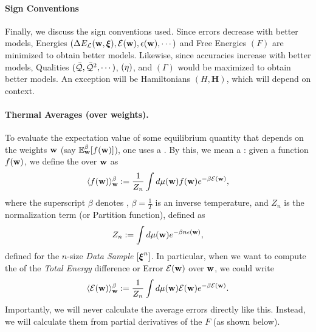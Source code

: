 \paragraph{Sign Conventions}
Finally, we discuss the sign conventions used.  Since errors decrease with better models,
Energies $(\Delta E_{\mathcal{L}}(\mathbf{w},\boldsymbol{\xi}), \mathcal{E}(\mathbf{w}), \epsilon({\mathbf{w}}), \cdots)$ and Free Energies $(F)$ are minimized to obtain better models.
Likewise, since accuracies increase with better models, Qualities $(\bar{\mathcal{Q}}, \bar{\mathcal{Q}}^{2}, \cdots)$,
\SelfOverlap $(\eta)$, and \Quality \GeneratingFunction $(\Gamma)$ would be maximized to obtain better models.
An exception will be Hamiltonians $(H,\mathbf{H})$, which will depend on context.

\paragraph{Thermal Averages (over weights).}

To evaluate the expectation value of some equilibrium quantity that depends on the weights ${\mathbf{w}}$ (say $\mathbb{E}^{\beta}_{{\mathbf{w}}}[f({\mathbf{w}})]$), one uses a \ThermalAverage.
By this, we mean a \emph{\BoltzmannWeightedAverage}: given a function $f({\mathbf{w}})$,
we define the \ThermalAverage over ${\mathbf{w}}$ as
\begin{align}
\label{eqn:thrmavg}
\langle f({\mathbf{w}})\rangle_{{\mathbf{w}}}^{{\beta}}:=\dfrac{1}{Z_{n}}\int d\mu({\mathbf{w}}) f({\mathbf{w}})e^{-\beta \mathcal{E}(\mathbf{w})}  ,
\end{align}
where the superscript $\beta$ denotes \ThermalAverage,
$\beta=\frac{1}{T}$ is an inverse temperature, and 
$Z_{n}$ is the normalization term (or Partition function), defined as
\begin{align}
\label{eqn:Zwn}
Z_{n}:=\int d\mu({\mathbf{w}}) e^{-\beta n\epsilon({\mathbf{w}})},
\end{align}
defined for the $n$-size \emph{Data Sample} $[\boldsymbol{\xi}^{n}]$.
%
In particular, when we want to compute the \ThermalAverage of the \emph{Total Energy} difference or Error
$\mathcal{E}(\mathbf{w})$ over ${\mathbf{w}}$, we could write
\begin{align}
\label{eqn:Detot}
\langle \mathcal{E}(\mathbf{w}) \rangle^{\beta}_{{\mathbf{w}}}:=\dfrac{1}{Z_{n}}\int d\mu({\mathbf{w}}) \mathcal{E}(\mathbf{w}) e^{-\beta \mathcal{E}(\mathbf{w})} .
\end{align}
Importantly, we will never calculate the average errors directly like this.
Instead, we will calculate them from partial derivatives of the \FreeEnergy $F$ (as shown below).

